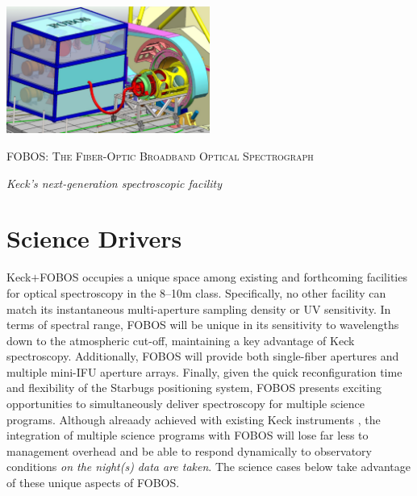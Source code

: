 \documentclass[oneside,11pt]{amsart}
\begin{document}


\vspace*{-1.5cm}

\centerline{\includegraphics[width=0.5\textwidth]{figs/FOBOS_inst_v2.pdf}}
\centerline{\textsc {\Large FOBOS: The Fiber-Optic Broadband Optical Spectrograph}}
\smallskip
\centerline{\large\it Keck's next-generation spectroscopic facility}




\section{Science Drivers}
\label{sec:goals}

Keck$+$FOBOS occupies a unique space among existing and forthcoming
facilities for optical spectroscopy in the 8--10m class.
Specifically, no other facility can match its instantaneous
multi-aperture sampling density or UV sensitivity. In terms of
spectral range, FOBOS will be unique in its sensitivity to
wavelengths down to the atmospheric cut-off, maintaining a key
advantage of Keck spectroscopy. Additionally, FOBOS will provide both
single-fiber apertures and multiple mini-IFU aperture arrays.
Finally, given the quick reconfiguration time and flexibility of the
Starbugs positioning system, FOBOS presents exciting opportunities to
simultaneously deliver spectroscopy for multiple science programs.
Although alreaady achieved with existing Keck instruments
\citep[e.g., Halo7D with DEIMOS;][]{2018arXiv180904082C}, the
integration of multiple science programs with FOBOS will lose far
less to management overhead and be able to respond dynamically to
observatory conditions {\it on the night(s) data are taken}. The
science cases below take advantage of these unique aspects of FOBOS.

\end{document}
